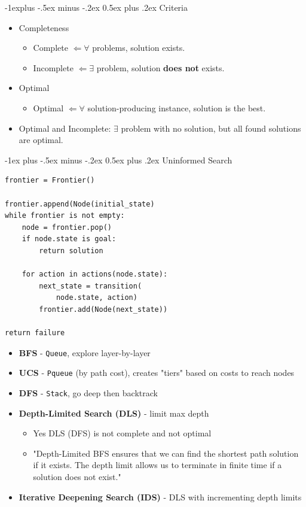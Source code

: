\documentclass[10pt, landscape]{article}
\makeatletter
\renewcommand{\section}{\@startsection{section}{1}{0mm}%
                                {-1ex plus -.5ex minus -.2ex}%
                                {0.5ex plus .2ex}%
                                {\normalfont\large\bfseries}}
\renewcommand{\subsection}{\@startsection{subsection}{2}{0mm}%
                                {-1explus -.5ex minus -.2ex}%
                                {0.5ex plus .2ex}%
                                {\normalfont\normalsize\bfseries}}
\newcommand{\code}[1]{\textcolor{myred}{\texttt{#1}}}
\makeatother
\begin{document}
\begin{multicols}{4}
\subsection{Criteria}
\begin{itemize}
    \item Completeness
    \begin{itemize}
        \item Complete $\Leftarrow \forall$ problems, solution exists.
        \item Incomplete $\Leftarrow \exists$ problem, solution \textbf{does not} exists.
    \end{itemize}
    \item Optimal
    \begin{itemize}
        \item Optimal $\Leftarrow \forall$ solution-producing instance, solution is the best.
    \end{itemize}
    \item Optimal and Incomplete: $\exists$ problem with no solution, but all found solutions are optimal.
\end{itemize}

\section{Uninformed Search}

\begin{verbatim}
frontier = Frontier()

frontier.append(Node(initial_state)
while frontier is not empty:
	node = frontier.pop()
	if node.state is goal:
		return solution
		
	for action in actions(node.state):
		next_state = transition(
            node.state, action)
		frontier.add(Node(next_state))
	
return failure    
\end{verbatim}

\begin{itemize}
    \item \textbf{BFS} - \code{Queue}, explore layer-by-layer
    \item \textbf{UCS} - \code{Pqueue} (by path cost), creates "tiers" based on costs to reach nodes
    \item \textbf{DFS} - \code{Stack}, go deep then backtrack
    \item \textbf{Depth-Limited Search (DLS)} - limit max depth
    \begin{itemize}
        \item Yes DLS (DFS) is not complete and not optimal
        \item "Depth-Limited BFS ensures that we can find the shortest path solution if it exists. The depth limit allows us to terminate in finite time if a solution does not exist."
    \end{itemize}
    \item \textbf{Iterative Deepening Search (IDS)} - DLS with incrementing depth limits
    

\end{itemize}
\end{multicols}
\end{document}
